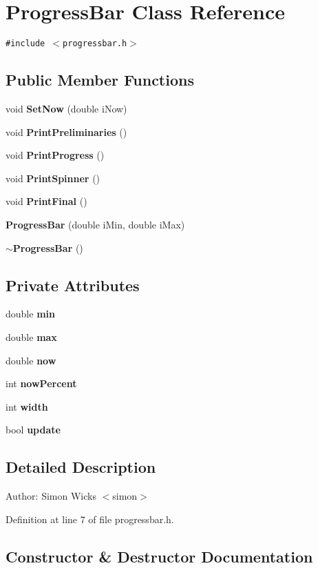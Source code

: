 \section{ProgressBar Class Reference}
\label{classProgressBar}
{\tt \#include $<$progressbar.h$>$}

\subsection*{Public Member Functions}
\begin{CompactItemize}
\item 
void {\bf SetNow} (double iNow)
\item 
void {\bf PrintPreliminaries} ()
\item 
void {\bf PrintProgress} ()
\item 
void {\bf PrintSpinner} ()
\item 
void {\bf PrintFinal} ()
\item 
{\bf ProgressBar} (double iMin, double iMax)
\item 
{\bf $\sim$ProgressBar} ()
\end{CompactItemize}
\subsection*{Private Attributes}
\begin{CompactItemize}
\item 
double {\bf min}
\item 
double {\bf max}
\item 
double {\bf now}
\item 
int {\bf nowPercent}
\item 
int {\bf width}
\item 
bool {\bf update}
\end{CompactItemize}


\subsection{Detailed Description}
\begin{Desc}
\item[Author:]Simon Wicks $<$simon$>$ \end{Desc}


Definition at line 7 of file progressbar.h.

\subsection{Constructor \& Destructor Documentation}
